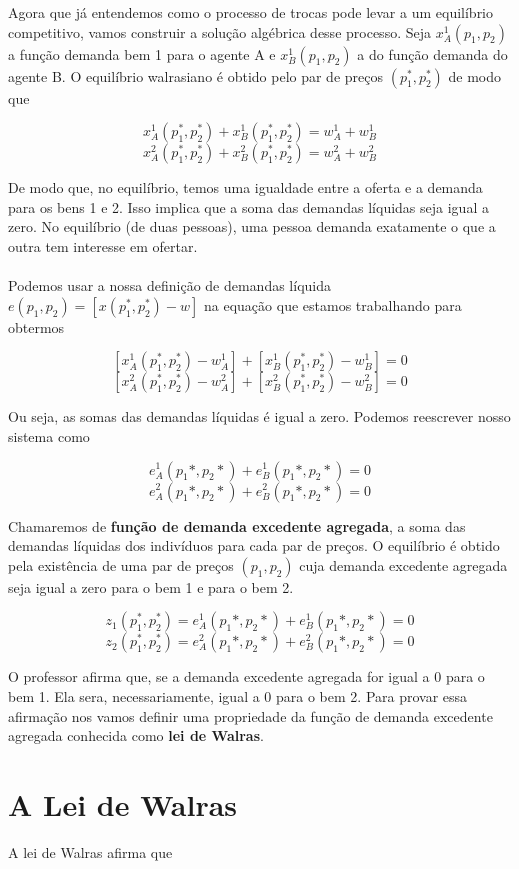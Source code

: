 \documentclass[a4paper,11pt,oneside]{book}
\theoremstyle{definition}
\theoremstyle{break}
\begin{document}
Agora que já entendemos como o processo de trocas pode levar a um equilíbrio competitivo, vamos construir a solução algébrica desse processo. Seja $x_A^1(p_1,p_2)$ a função demanda  bem 1 para o agente A e $x_B^1(p_1,p_2)$ a do função demanda do agente B. O equilíbrio walrasiano é obtido pelo par de preços $(p_1^*,p_2^*)$ de modo que

$$ x_A^1(p_1^*,p_2^*) + x_B^1(p_1^*,p_2^*) = w_A^1 + w_B^1 $$
$$ x_A^2(p_1^*,p_2^*) + x_B^2(p_1^*,p_2^*) = w_A^2 + w_B^2 $$

De modo que, no equilíbrio, temos uma igualdade entre a oferta e a demanda para os bens 1 e 2. Isso implica que a soma das demandas líquidas seja igual a zero. No equilíbrio (de duas pessoas), uma pessoa demanda exatamente o que a outra tem interesse em ofertar.
\\
\\
Podemos usar a nossa definição de demandas líquida $e(p_1,p_2) = [x(p_1^*,p_2^*) - w]$ na equação que estamos trabalhando para obtermos

$$ [x_A^1(p_1^*,p_2^*) - w_A^1] + [x_B^1(p_1^*,p_2^*) - w_B^1] = 0 $$
$$ [x_A^2(p_1^*,p_2^*) - w_A^2] + [x_B^2(p_1^*,p_2^*) - w_B^2] = 0 $$

Ou seja, as somas das demandas líquidas é igual a zero. Podemos reescrever nosso sistema como

$$ e_A^1(p_1*,p_2*) + e_B^1(p_1*,p_2*) = 0 $$
$$ e_A^2(p_1*,p_2*) + e_B^2(p_1*,p_2*) = 0 $$


Chamaremos de \textbf{função de demanda excedente agregada}, a soma das demandas líquidas dos indivíduos para cada par de preços. O equilíbrio é obtido pela existência de uma par de preços $(p_1,p_2)$ cuja demanda excedente agregada seja igual a zero para o bem 1 e para o bem 2.

$$z_1(p_1^*,p_2^*) = e_A^1(p_1*,p_2*) + e_B^1(p_1*,p_2*) = 0$$
$$z_2(p_1^*,p_2^*) = e_A^2(p_1*,p_2*) + e_B^2(p_1*,p_2*) = 0$$


O professor afirma que, se a demanda excedente agregada for igual a 0 para o bem 1. Ela sera, necessariamente, igual a 0 para o bem 2. Para provar essa afirmação nos vamos definir uma propriedade da função de demanda excedente agregada conhecida como \textbf{lei de Walras}.

\section{A Lei de Walras}

A lei de Walras afirma que
\end{document}
